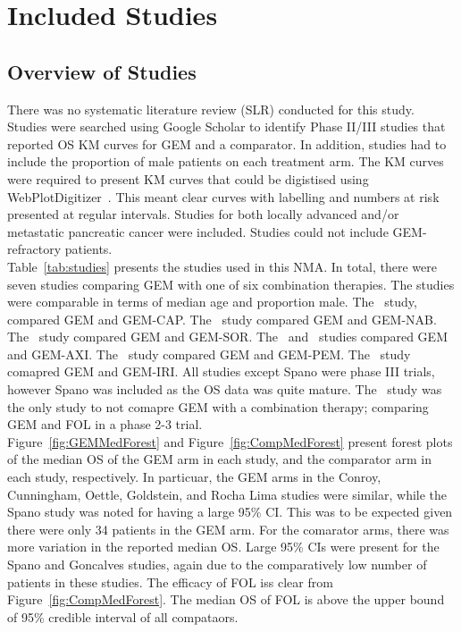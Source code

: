 \chapter{Included Studies}\label{trialschap}

\section{Overview of Studies}
There was no systematic literature review (SLR) conducted for this study. Studies were searched using Google Scholar to identify Phase II/III studies that reported OS KM curves for GEM and a comparator. In addition, studies had to include the proportion of male patients on each treatment arm. The KM curves were required to present KM curves that could be digistised using WebPlotDigitizer~\cite{wpd}. This meant clear curves with labelling and numbers at risk presented at regular intervals. Studies for both locally advanced and/or metastatic pancreatic cancer were included. Studies could not include GEM-refractory patients.\\

Table~\ref{tab:studies} presents the studies used in this NMA. In total, there were seven studies comparing GEM with one of six combination therapies. The studies were comparable in terms of median age and proportion male. The~\cite{cunningham2009} study, compared GEM and GEM-CAP. The~\cite{goldstein2015} study compared GEM and GEM-NAB. The~\cite{gonccalves2012} study compared GEM and GEM-SOR. The~\cite{kindler2011} and~\cite{spano2008} studies compared GEM and GEM-AXI. The~\cite{oettle2005} study compared GEM and GEM-PEM. The~\cite{rocha2004} study comapred GEM and GEM-IRI. All studies except Spano were phase III trials, however Spano was included as the OS data was quite mature. The~\cite{conroy} study was the only study to not comapre GEM with a combination therapy; comparing GEM and FOL in a phase 2-3 trial.\\

Figure~\ref{fig:GEMMedForest} and Figure~\ref{fig:CompMedForest} present forest plots of the median OS of the GEM arm in each study, and the comparator arm in each study, respectively. In particuar, the GEM arms in the Conroy, Cunningham, Oettle, Goldstein, and Rocha Lima studies were similar, while the Spano study was noted for having a large 95\% CI. This was to be expected given there were only 34 patients in the GEM arm. For the comarator arms, there was more variation in the reported median OS. Large 95\% CIs were present for the Spano and Goncalves studies, again due to the comparatively low number of patients in these studies. The efficacy of FOL iss clear from Figure~\ref{fig:CompMedForest}. The median OS of FOL is above the upper bound of 95\% credible interval of all compataors. \\

